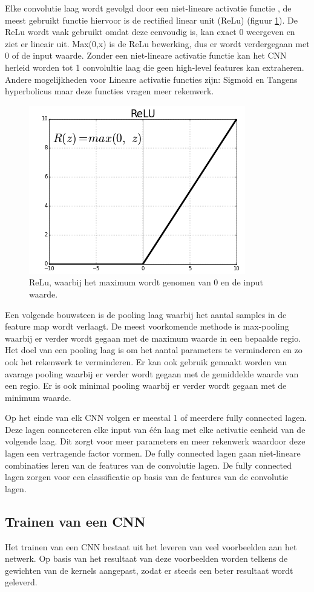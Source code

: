 Elke convolutie laag wordt gevolgd door een niet-lineare activatie functie %
, de meest gebruikt functie hiervoor is de rectified linear unit (ReLu) (figuur \ref{fig:relu}). 
De ReLu wordt vaak gebruikt omdat deze eenvoudig is, kan exact 0 weergeven en ziet er lineair uit. 
Max(0,x) is de ReLu bewerking, dus er wordt verdergegaan met 0 of de input waarde. 
Zonder een niet-lineare activatie functie kan het CNN herleid worden tot 1 convolultie laag die geen high-level features kan extraheren. 
Andere mogelijkheden voor Lineare activatie functies zijn: Sigmoid en Tangens hyperbolicus maar deze functies vragen meer rekenwerk.

\begin{figure}[!ht]
 	\centering
 	\includegraphics[width=0.35\linewidth]{fig/ReLu.png}
 	\caption{ReLu, waarbij het maximum wordt genomen van 0 en de input waarde.}
 	\label{fig:relu}
\end{figure}

Een volgende bouwsteen is de pooling laag waarbij het aantal samples in de feature map wordt verlaagt. 
De meest voorkomende methode is max-pooling waarbij er verder wordt gegaan met de maximum waarde in een bepaalde regio. 
Het doel van een pooling laag is om het aantal parameters te verminderen en zo ook het rekenwerk te verminderen. 
Er kan ook gebruik gemaakt worden van avarage pooling waarbij er verder wordt gegaan met de gemiddelde waarde van een regio. 
Er is ook minimal pooling waarbij er verder wordt gegaan met de minimum waarde.

Op het einde van elk CNN volgen er meestal 1 of meerdere fully connected lagen. 
Deze lagen connecteren elke input van \'e\'en laag met elke activatie eenheid van de volgende laag. 
Dit zorgt voor meer parameters en meer rekenwerk waardoor deze lagen een vertragende factor vormen. 
De fully connected lagen gaan niet-lineare combinaties leren van de features van de convolutie lagen. 
De fully connected lagen zorgen voor een classificatie op basis van de features van de convolutie lagen.

\subsection{Trainen van een CNN}
Het trainen van een CNN bestaat uit het leveren van veel voorbeelden aan het netwerk. 
Op basis van het resultaat van deze voorbeelden worden telkens de gewichten van de kernels aangepast, zodat er steeds een beter resultaat wordt geleverd. 


